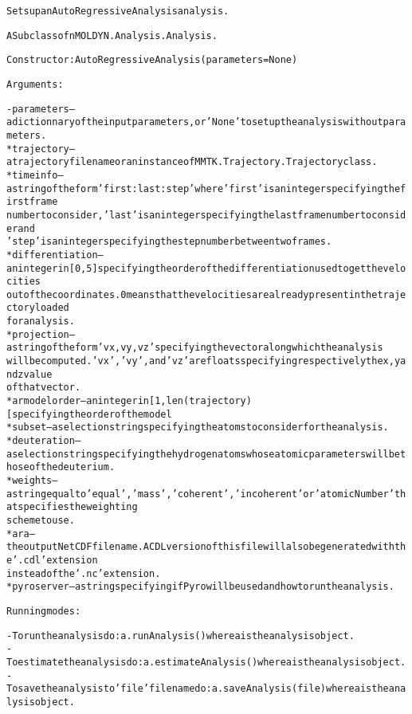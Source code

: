 \begin{alltt}
Sets up an AutoRegressive Analysis analysis.

A Subclass of nMOLDYN.Analysis.Analysis. 

Constructor: AutoRegressiveAnalysis({\textbar}parameters{\textbar} = None)

Arguments:

    - {\textbar}parameters{\textbar} -- a dictionnary of the input parameters, or 'None' to set up the analysis without parameters.
        * trajectory      -- a trajectory file name or an instance of MMTK.Trajectory.Trajectory class.
        * timeinfo        -- a string of the form 'first:last:step' where 'first' is an integer specifying the first frame 
                             number to consider, 'last' is an integer specifying the last frame number to consider and 
                             'step' is an integer specifying the step number between two frames.
        * differentiation -- an integer in [0,5] specifying the order of the differentiation used to get the velocities
                             out of the coordinates. 0 means that the velocities are already present in the trajectory loaded
                             for analysis.
        * projection      -- a string of the form 'vx,vy,vz' specifying the vector along which the analysis
                             will be computed. 'vx', 'vy', and 'vz' are floats specifying respectively the x, y and z value 
                             of that vector.
        * armodelorder    -- an integer in [1, len(trajectory)[ specifying the order of the model
        * subset          -- a selection string specifying the atoms to consider for the analysis.
        * deuteration     -- a selection string specifying the hydrogen atoms whose atomic parameters will be those of the deuterium.
        * weights         -- a string equal to 'equal', 'mass', 'coherent' , 'incoherent' or 'atomicNumber' that specifies the weighting
                             scheme to use.
        * ara             -- the output NetCDF file name. A CDL version of this file will also be generated with the '.cdl' extension
                             instead of the '.nc' extension.
        * pyroserver      -- a string specifying if Pyro will be used and how to run the analysis.
    
Running modes:

    - To run the analysis do: a.runAnalysis() where a is the analysis object.
    - To estimate the analysis do: a.estimateAnalysis() where a is the analysis object.
    - To save the analysis to 'file' file name do: a.saveAnalysis(file) where a is the analysis object.
\end{alltt}


